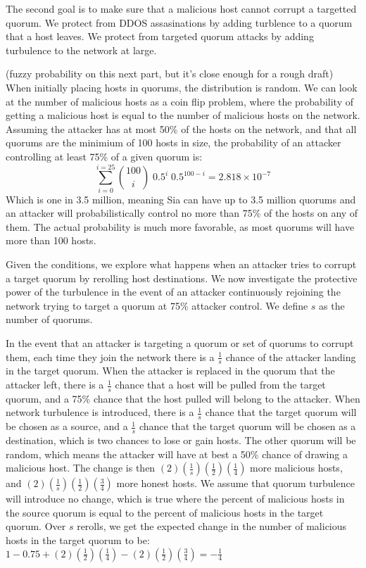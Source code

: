 \documentclass[twocolumn]{article}
\begin{document}
The second goal is to make sure that a malicious host cannot corrupt a targetted quorum.
We protect from DDOS assasinations by adding turblence to a quorum that a host leaves.
We protect from targeted quorum attacks by adding turbulence to the network at large.

(fuzzy probability on this next part, but it's close enough for a rough draft)
When initially placing hosts in quorums, the distribution is random.
We can look at the number of malicious hosts as a coin flip problem, where the probability of getting a malicious host is equal to the number of malicious hosts on the network.
Assuming the attacker has at most 50\% of the hosts on the network, and that all quorums are the minimium of 100 hosts in size, the probability of an attacker controlling at least 75\% of a given quorum is:
\begin{equation}
\sum_{i=0}^{i=25} {100 \choose i} \; 0.5^{i} \; 0.5^{100-i} = 2.818\times10^{-7}
\end{equation}
Which is one in 3.5 million, meaning Sia can have up to 3.5 million quorums and an attacker will probabilistically control no more than 75\% of the hosts on any of them.
The actual probability is much more favorable, as most quorums will have more than 100 hosts.

Given the conditions, we explore what happens when an attacker tries to corrupt a target quorum by rerolling host destinations.
We now investigate the protective power of the turbulence in the event of an attacker continuously rejoining the network trying to target a quorum at 75\% attacker control.
We define $s$ as the number of quorums.

In the event that an attacker is targeting a quorum or set of quorums to corrupt them, each time they join the network there is a $\frac{1}{s}$ chance of the attacker landing in the target quorum.
When the attacker is replaced in the quorum that the attacker left, there is a $\frac{1}{s}$ chance that a host will be pulled from the target quorum, and a 75\% chance that the host pulled will belong to the attacker.
When network turbulence is introduced, there is a $\frac{1}{s}$ chance that the target quorum will be chosen as a source, and a $\frac{1}{s}$ chance that the target quorum will be chosen as a destination, which is two chances to lose or gain hosts.
The other quorum will be random, which means the attacker will have at best a 50\% chance of drawing a malicious host.
The change is then $(2)(\frac{1}{s})(\frac{1}{2})(\frac{1}{4})$ more malicious hosts, and $(2)(\frac{1}{s})(\frac{1}{2})(\frac{3}{4})$ more honest hosts.
We assume that quorum turbulence will introduce no change, which is true where the percent of malicious hosts in the source quorum is equal to the percent of malicious hosts in the target quorum.
Over $s$ rerolls, we get the expected change in the number of malicious hosts in the target quorum to be:
$1 - 0.75 + (2)(\frac{1}{2})(\frac{1}{4}) - (2)(\frac{1}{2})(\frac{3}{4}) = -\frac{1}{4}$
\end{document}
